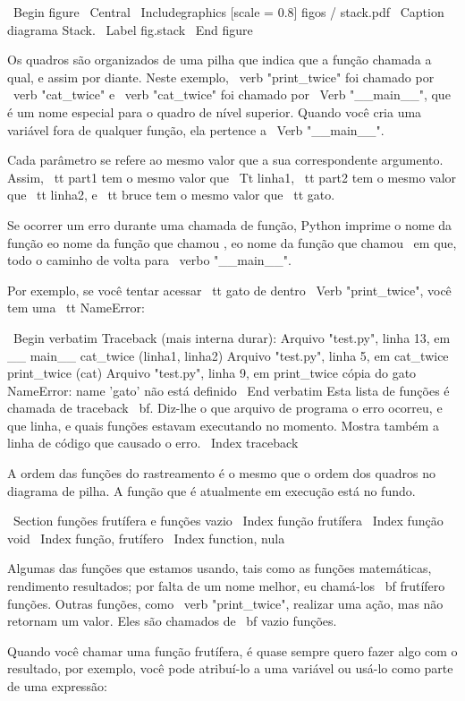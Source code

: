 \documentclass[10pt]{book}
\begin{document}
\begin {itemize}
{\ Begin {figure}
\ Central
{\ Includegraphics [scale = 0.8] {figos / stack.pdf}}
\ Caption {diagrama Stack.}
\ Label {} fig.stack
\ End {figure}


Os quadros são organizados de uma pilha que indica que a função
chamada a qual, e assim por diante. Neste exemplo, \ verb "print_twice"
foi chamado por \ verb "cat_twice" e \ verb "cat_twice" foi chamado por 
\ Verb "__main__", que é um nome especial para o quadro de nível superior. Quando
você cria uma variável fora de qualquer função, ela pertence a 
\ Verb "__main__".

Cada parâmetro se refere ao mesmo valor que a sua correspondente
argumento. Assim, {\ tt part1} tem o mesmo valor que
{\ Tt linha1}, {\ tt part2} tem o mesmo valor que {\ tt linha2},
e {\ tt bruce} tem o mesmo valor que {\ tt gato}.

Se ocorrer um erro durante uma chamada de função, Python imprime o
nome da função eo nome da função que chamou
, eo nome da função que chamou {\ em que}, todo o
caminho de volta para \ verbo "__main__".

Por exemplo, se você tentar acessar {\ tt} gato de dentro 
\ Verb "print_twice", você tem uma {\ tt NameError}:

\ Begin {verbatim}
Traceback (mais interna durar):
  Arquivo "test.py", linha 13, em __ main__
    cat_twice (linha1, linha2)
  Arquivo "test.py", linha 5, em cat_twice
    print_twice (cat)
  Arquivo "test.py", linha 9, em print_twice
    cópia do gato
NameError: name 'gato' não está definido
\ End {verbatim}
%
Esta lista de funções é chamada de traceback {\ bf}. Diz-lhe o que
arquivo de programa o erro ocorreu, e que linha, e quais funções
estavam executando no momento. Mostra também a linha de código que
causado o erro.
\ Index {} traceback

A ordem das funções do rastreamento é o mesmo que o
ordem dos quadros no diagrama de pilha. A função que é
atualmente em execução está no fundo.


\ Section {funções frutífera e funções vazio}
\ Index {função frutífera}
\ Index {função void}
\ Index {função, frutífero}
\ Index {function, nula} 

Algumas das funções que estamos usando, tais como as funções matemáticas, rendimento
resultados; por falta de um nome melhor, eu chamá-los {\ bf frutífero
  funções}. Outras funções, como \ verb "print_twice", realizar uma
ação, mas não retornam um valor. Eles são chamados de {\ bf vazio
  funções}.

Quando você chamar uma função frutífera, é quase sempre
quero fazer algo com o resultado, por exemplo, você pode
atribuí-lo a uma variável ou usá-lo como parte de uma expressão:

}
\end{itemize}
\end{document}
